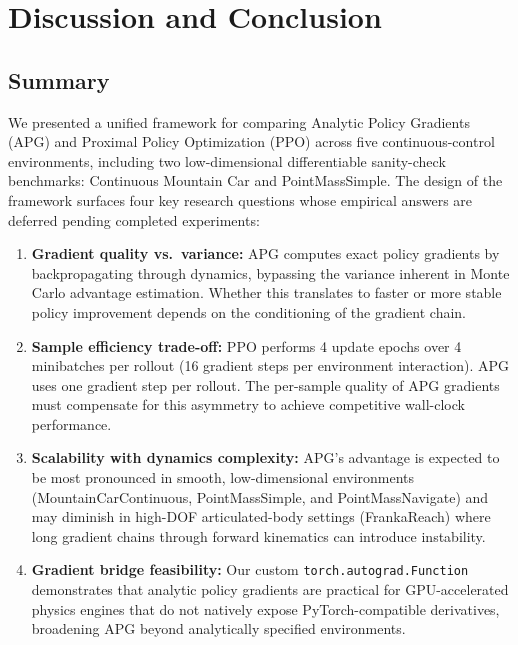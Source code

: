 \documentclass[11pt,a4paper]{article}
\begin{document}
\section{Discussion and Conclusion}
\label{sec:conclusion}

\subsection{Summary}
\label{sec:summary}

We presented a unified framework for comparing Analytic Policy Gradients (APG) and Proximal Policy Optimization (PPO) across five continuous-control environments, including two low-dimensional differentiable sanity-check benchmarks: Continuous Mountain Car and PointMassSimple. The design of the framework surfaces four key research questions whose empirical answers are deferred pending completed experiments:


\begin{enumerate}
  \item \textbf{Gradient quality vs.\ variance:} APG computes exact policy gradients by backpropagating through dynamics, bypassing the variance inherent in Monte Carlo advantage estimation. Whether this translates to faster or more stable policy improvement depends on the conditioning of the gradient chain.

  \item \textbf{Sample efficiency trade-off:} PPO performs 4 update epochs over 4 minibatches per rollout (16 gradient steps per environment interaction). APG uses one gradient step per rollout. The per-sample quality of APG gradients must compensate for this asymmetry to achieve competitive wall-clock performance.

  \item \textbf{Scalability with dynamics complexity:} APG's advantage is expected to be most pronounced in smooth, low-dimensional environments (MountainCarContinuous, PointMassSimple, and PointMassNavigate) and may diminish in high-DOF articulated-body settings (FrankaReach) where long gradient chains through forward kinematics can introduce instability.

  \item \textbf{Gradient bridge feasibility:} Our custom \texttt{torch.autograd.Function} demonstrates that analytic policy gradients are practical for GPU-accelerated physics engines that do not natively expose PyTorch-compatible derivatives, broadening APG beyond analytically specified environments.
\end{enumerate}
\end{document}
